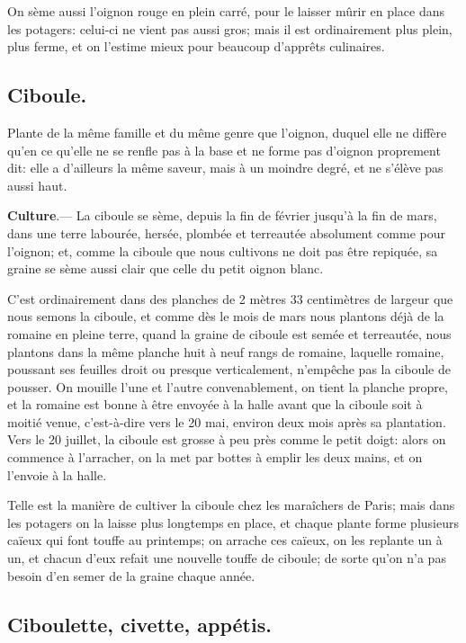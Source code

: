 \documentclass[10pt,a4paper]{book}
\begin{document}
On sème aussi l'oignon rouge en plein carré, pour le laisser mûrir en place dans les potagers: celui-ci ne vient pas aussi gros; mais il est ordinairement plus plein, plus ferme, et on l'estime mieux pour beaucoup d'apprêts culinaires.

\subsection{Ciboule.}

Plante de la même famille et du même genre que l'oignon, duquel elle ne diffère qu'en ce qu'elle ne se renfle pas à la base et ne forme pas d'oignon proprement dit: elle a d'ailleurs la même saveur, mais à un moindre degré, et ne s'élève pas aussi haut.

\textbf{Culture}.--- La ciboule se sème, depuis la fin de février jusqu'à la fin de mars, dans une terre labourée, hersée, plombée et terreautée absolument comme pour l'oignon; et, comme la ciboule que nous cultivons ne doit pas être repiquée, sa graine se sème aussi clair que celle du petit oignon blanc.

C'est ordinairement dans des planches de 2 mètres 33 centimètres de largeur que nous semons la ciboule, et comme dès le mois de mars nous plantons déjà de la romaine en pleine terre, quand la graine de ciboule est semée et terreautée, nous plantons dans la même planche huit à neuf rangs de romaine, laquelle romaine, poussant ses feuilles droit ou presque verticalement, n'empêche pas la ciboule de pousser. On mouille l'une et l'autre convenablement, on tient la planche propre, et la romaine est bonne à être envoyée à la halle avant que la ciboule soit à moitié venue, c'est-à-dire vers le 20 mai, environ deux mois après sa plantation. Vers le 20 juillet, la ciboule est grosse à peu près comme le petit doigt: alors on commence à l'arracher, on la met par bottes à emplir les deux mains, et on l'envoie à la halle.

Telle est la manière de cultiver la ciboule chez les maraîchers de Paris; mais dans les potagers on la laisse plus longtemps en place, et chaque plante forme plusieurs caïeux qui font touffe au printemps; on arrache ces caïeux, on les replante un à un, et chacun d'eux refait une nouvelle touffe de ciboule; de sorte qu'on n'a pas besoin d'en semer de la graine chaque année.

\subsection{Ciboulette, civette, appétis.}
\end{document}
